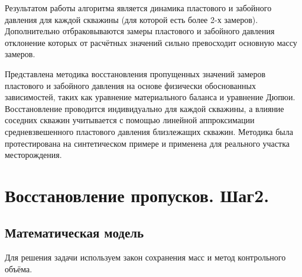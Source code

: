 \documentclass[14pt]{article}
\begin{document}
Результатом работы алгоритма является динамика пластового и забойного давления для каждой скважины (для которой есть более 2-х замеров). Дополнительно отбраковываются замеры пластового и забойного давления отклонение которых от расчётных значений сильно превосходит основную массу замеров.

Представлена методика восстановления пропущенных значений замеров пластового и забойного давления на основе физически обоснованных зависимостей, таких как уравнение материального баланса и уравнение Дюпюи. Восстановление проводится индивидуально для каждой скважины, а влияние соседних скважин учитывается с помощью линейной аппроксимации средневзвешенного пластового давления близлежащих скважин. Методика была протестирована на синтетическом примере и применена для реального участка месторождения.

\section{Восстановление пропусков. Шаг2.}

\subsection{Математическая модель}
Для решения задачи используем закон сохранения масс и метод контрольного объёма. 
\end{document}
